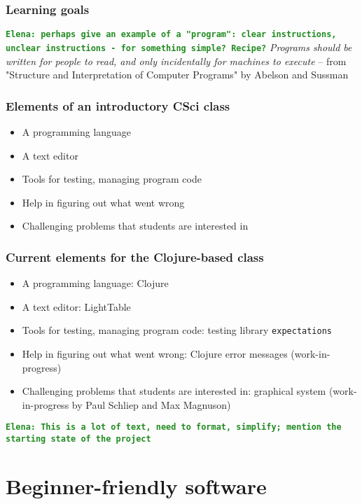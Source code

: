 \documentclass{beamer}
\newcommand{\comment}[1]{{\bf \tt  {#1}}}
\newcommand{\emcomment}[1]{\textcolor{ForestGreen}{\comment{Elena: {#1}}}}
\begin{document}
\begin{frame}[fragile]
\frametitle{Learning goals}
\emcomment{perhaps give an example of a "program": clear instructions, unclear instructions - for something simple? Recipe?}
{\it Programs should be written for people to read, and only incidentally for machines to execute} --	 
from "Structure and Interpretation of Computer Programs" by Abelson and Sussman
\end{frame}

\begin{frame}[fragile]
\frametitle{Elements of an introductory CSci class}
\begin{itemize}
\item A programming language
\item A text editor
\item Tools for testing, managing program code
\item Help in figuring out what went wrong
\item Challenging problems that students are interested in
\end{itemize}
\end{frame}

\begin{frame}[fragile]
\frametitle{Current elements for the Clojure-based class}
\begin{itemize}
\item A programming language: Clojure
\item A text editor: LightTable
\item Tools for testing, managing program code: testing library {\tt expectations}
\item Help in figuring out what went wrong: Clojure error messages (work-in-progress)
\item Challenging problems that students are interested in: graphical system (work-in-progress by Paul Schliep and Max Magnuson)
\end{itemize}
\emcomment{This is a lot of text, need to format, simplify; mention the starting state of the project}
\end{frame}

\section{Beginner-friendly software}

%
\end{document}
